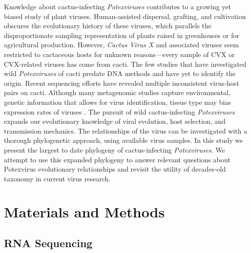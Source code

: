 \documentclass[11pt,letterpaper,titlepage]{article}
\begin{document}
\begin{linenumbers}
Knowledge about cactus-infecting \textit{Potexviruses} contributes to a growing yet biased study of plant viruses. 
Human-assisted dispersal, grafting, and cultivation obscures the evolutionary history of these viruses, which parallels the disproportionate sampling representation of plants raised in greenhouses or for agricultural production. 
However, \textit{Cactus Virus X} and associated viruses seem restricted to cactaceous hosts for unknown reasons---every sample of CVX or CVX-related viruses has come from cacti.
The few studies that have investigated wild \textit{Potexviruses} of cacti predate DNA methods and have yet to identify the origin.
Recent sequencing efforts have revealed multiple inconsistent virus-host pairs on cacti.
Although many metagenomic studies capture environmental, genetic information that allows for virus identification, tissue type may bias expression rates of viruses \citep{lacroix2016methodological}.
The pursuit of wild cactus-infecting \textit{Potexviruses} expands our evolutionary knowledge of viral evolution, host selection, and transmission mechanics. 
The relationships of the virus can be investigated with a thorough phylogenetic approach, using available virus samples. 
In this study we present the largest to date phylogeny of cactus-infecting \textit{Potexviruses}.
We attempt to use this expanded phylogeny to answer relevant questions about Potexvirus evolutionary relationships and revisit the utility of decades-old taxonomy in current virus research. 


\section*{Materials and Methods}

\subsection*{RNA Sequencing}


\end{linenumbers}
\end{document}
